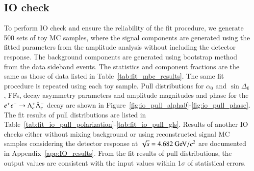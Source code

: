 \subsection{IO check}
\label{sec:io_check}
To perform IO check and ensure the reliability of the fit procedure, we generate 500 sets of toy MC samples, where the signal components are generated using the fitted parameters from the amplitude analysis without including the detector response. The background components are generated using bootstrap method from the data sideband events. The statistics and component fractions are the same as those of data listed in Table~\ref{tab:fit_mbc_results}. The same fit procedure is repeated using each toy sample. Pull distributions for $\alpha_0$ and $\sin\Delta_0$, FFs, decay asymmetry parameters and amplitude magnitudes and phase for the $e^+e^-\rightarrow\Lambda_{c}^{+}\bar{\Lambda}_{c}^{-}$ decay are shown in Figure~\ref{fig:io_pull_alpha0}-\ref{fig:io_pull_phase}.
The fit results of pull distributions are listed in Table~\ref{tab:fit_io_pull_polarization}-\ref{tab:fit_io_pull_gls}. Results of another IO checks either without mixing background or using reconstructed signal MC samples considering the detector response at $\sqrt{s} = 4.682\gev/c^2$ are documented in Appendix~\ref{app:IO_results}.
From the fit results of pull distributions, the output values are consistent with the input values within 1$\sigma$ of statistical errors.

